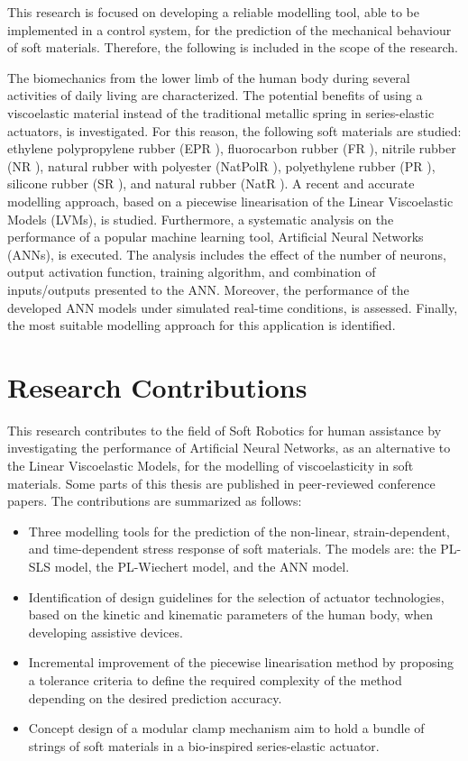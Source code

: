 This research is focused on developing a reliable modelling tool, able to be implemented in a control system, for the prediction of the mechanical behaviour of soft materials. Therefore, the following is included in the scope of the research. 

The biomechanics from the lower limb of the human body during several activities of daily living are characterized. The potential benefits of using a viscoelastic material instead of the traditional metallic spring in series-elastic actuators, is investigated. For this reason, the following soft materials are studied: ethylene polypropylene rubber (EPR \cite{EPRubber2019}), fluorocarbon rubber (FR \cite{FRubber2019}), nitrile rubber (NR \cite{NRubber2019}), natural rubber with polyester (NatPolR \cite{NatPolRubber2019}),  polyethylene  rubber  (PR \cite{PRubber2019}),  silicone  rubber  (SR \cite{SRubber2019}), and natural rubber (NatR \cite{NatRubber2019}). A recent and accurate modelling approach, based on a piecewise linearisation of the Linear Viscoelastic Models (LVMs), is studied. Furthermore, a systematic analysis on the performance of a popular machine learning tool, Artificial Neural Networks (ANNs), is executed. The analysis includes the effect of the number of neurons, output activation function, training algorithm, and combination of inputs/outputs presented to the ANN. Moreover, the performance of the developed ANN models under simulated real-time conditions, is assessed. Finally, the most suitable modelling approach for this application is identified.

\section{Research Contributions}

This research contributes to the field of Soft Robotics for human assistance by investigating the performance of Artificial Neural Networks, as an alternative to the Linear Viscoelastic Models, for the modelling of viscoelasticity in soft materials. Some parts of this thesis are published in peer-reviewed conference papers. The contributions are summarized as follows:

\begin{itemize}
    \item Three modelling tools for the prediction of the non-linear, strain-dependent, and time-dependent stress response of soft materials. The models are: the PL-SLS model, the PL-Wiechert model, and the ANN model.
    \item Identification of design guidelines for the selection of actuator technologies, based on the kinetic and kinematic parameters of the human body, when developing assistive devices.
    \item Incremental improvement of the piecewise linearisation method by proposing a tolerance criteria to define the required complexity of the method depending on the desired prediction accuracy. 
    \item Concept design of a modular clamp mechanism aim to hold a bundle of strings of soft materials in a bio-inspired series-elastic actuator.
\end{itemize}

